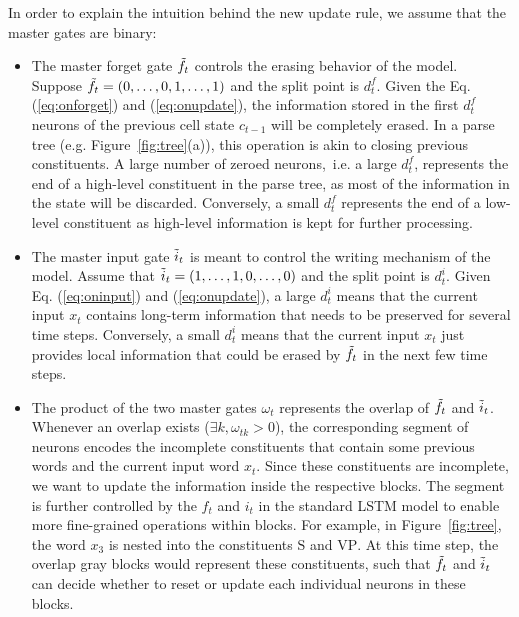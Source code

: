 \documentclass{article} \usepackage{iclr2019_conference,times}
\begin{document}
In order to explain the intuition behind the new update rule, we assume that the master gates are binary:
\begin{itemize}
    \item The master forget gate $\Tilde{f}_t$ controls the erasing behavior of the model. Suppose $\Tilde{f}_t=(0,\dots,0,1,\dots,1)$ and the split point is $d^f_t$. Given the Eq. (\ref{eq:onforget}) and (\ref{eq:onupdate}), the information stored in the first $d^f_t$ neurons of the previous cell state $c_{t-1}$ will be completely erased.
In a parse tree (e.g. Figure~\ref{fig:tree}(a)), this operation is akin to closing previous constituents.
    A large number of zeroed neurons,~i.e. a large $d^f_t$, represents the end of a high-level constituent in the parse tree, as most of the information in the state will be discarded. Conversely, a small $d^f_t$ represents the end of a low-level constituent as high-level information is kept for further processing.
    
    \item The master input gate $\Tilde{i}_t$ is meant to control the writing mechanism of the model. 
    Assume that $\Tilde{i}_t = (1,\dots,1,0,\dots,0)$ and the split point is $d^i_t$. 
    Given Eq. (\ref{eq:oninput}) and (\ref{eq:onupdate}), a large $d^i_t$ means that the current input $x_t$ contains long-term information that needs to be preserved for several time steps.
    Conversely, a small $d^i_t$ means that the current input $x_t$ just provides local information that could be erased by $\Tilde{f}_t$ in the next few time steps.
    
    \item The product of the two master gates $\omega_t$ represents the overlap of $\Tilde{f}_t$ and $\Tilde{i}_t$.
    Whenever an overlap exists ($\exists k, \omega_{tk} > 0$), the corresponding segment of neurons encodes the incomplete constituents that contain some previous words and the current input word $x_t$.
    Since these constituents are incomplete, we want to update the information inside the respective blocks. 
    The segment is further controlled by the $f_t$ and $i_t$ in the standard LSTM model to enable more fine-grained operations within blocks.
    For example, in Figure~\ref{fig:tree}, the word $x_3$ is nested into the constituents $\mathrm{S}$ and $\mathrm{VP}$. At this time step, the overlap gray blocks would represent these constituents, such that $\Tilde{f}_t$ and $\Tilde{i}_t$ can decide whether to reset or update each individual neurons in these blocks.
\end{itemize}
\end{document}
